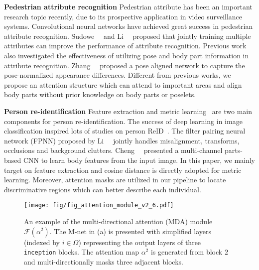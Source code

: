 \documentclass[10pt,twocolumn,letterpaper]{article}
\begin{document}
\noindent\textbf{Pedestrian attribute recognition}
Pedestrian attribute has been an important research topic recently, due to its prospective application in video surveillance systems. Convolutional neural networks have achieved great success in pedestrian attribute recognition. Sudowe~\etal~\cite{sudowe2015person} and Li~\etal~\cite{li2015multi} proposed that jointly training multiple attributes can improve the performance of attribute recognition.
Previous work also investigated the effectiveness of utilizing pose and body part information in attribute recognition.
Zhang~\etal~\cite{zhang2014panda} proposed a pose aligned network to capture the pose-normalized appearance differences.
Different from previous works, we propose an attention structure which can attend to important areas and align body parts without prior knowledge on body parts or poselets.

\noindent \textbf{Person re-identification}
Feature extraction and metric learning~\cite{koestinger2012large,liao2015person} are two main components for person re-identification.
The success of deep learning in image classification inspired lots of studies on person ReID~\cite{cheng2016person, li2014deepreid, xiao2016learning, wu2016personnet, varior2016gated, su2016deep, ustinova2015multiregion, li2017person, xiao2017joint}.
The filter pairing neural network (FPNN) proposed by Li~\etal~\cite{li2014deepreid} jointly handles misalignment, transforms, occlusions and background clutters.
Cheng~\etal~\cite{cheng2016person} presented a multi-channel parts-based CNN to learn body features from the input image.
In this paper, we mainly target on feature extraction and cosine distance is directly adopted for metric learning.
Moreover, attention masks are utilized in our pipeline to locate discriminative regions which can better describe each individual.













\begin{figure}[t]
\centering
\texttt{[image: fig/fig\_attention\_module\_v2\_6.pdf]}
\caption{An example of the multi-directional attention (MDA) module $\mathcal{F}(\alpha^2)$. The M-net in (a) is presented with simplified layers (indexed by $i\in\Omega$) representing the output layers of three \texttt{inception} blocks. The attention map $\alpha^2$ is generated from block $2$ and multi-directionally masks three adjacent blocks.
}
\label{fig:attention_module}
\end{figure}
\end{document}

